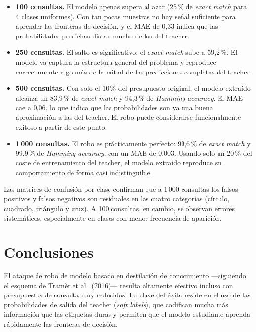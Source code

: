 \documentclass[11pt,a4paper]{article}
\begin{document}
\begin{itemize}
  \item \textbf{100 consultas.} El modelo apenas supera al azar (25\,\% de \textit{exact match} para 4 clases uniformes). Con tan pocas muestras no hay señal suficiente para aprender las fronteras de decisión, y el MAE de 0,33 indica que las probabilidades predichas distan mucho de las del teacher.

  \item \textbf{250 consultas.} El salto es significativo: el \textit{exact match} sube a 59,2\,\%. El modelo ya captura la estructura general del problema y reproduce correctamente algo más de la mitad de las predicciones completas del teacher.

  \item \textbf{500 consultas.} Con solo el 10\,\% del presupuesto original, el modelo extraído alcanza un 83,9\,\% de \textit{exact match} y 94,3\,\% de \textit{Hamming accuracy}. El MAE cae a 0,06, lo que indica que las probabilidades son ya una buena aproximación a las del teacher. El robo puede considerarse funcionalmente exitoso a partir de este punto.

  \item \textbf{1\,000 consultas.} El robo es prácticamente perfecto: 99,6\,\% de \textit{exact match} y 99,9\,\% de \textit{Hamming accuracy}, con un MAE de 0,003. Usando solo un 20\,\% del coste de entrenamiento del teacher, el modelo extraído reproduce su comportamiento de forma casi indistinguible.
\end{itemize}

Las matrices de confusión por clase confirman que a 1\,000 consultas los falsos positivos y falsos negativos son residuales en las cuatro categorías (círculo, cuadrado, triángulo y cruz). A 100 consultas, en cambio, se observan errores sistemáticos, especialmente en clases con menor frecuencia de aparición.

\section{Conclusiones}

El ataque de robo de modelo basado en destilación de conocimiento —siguiendo el esquema de Tramèr et al.\ (2016)— resulta altamente efectivo incluso con presupuestos de consulta muy reducidos. La clave del éxito reside en el uso de las probabilidades de salida del teacher (\textit{soft labels}), que codifican mucha más información que las etiquetas duras y permiten que el modelo estudiante aprenda rápidamente las fronteras de decisión.
\end{document}
